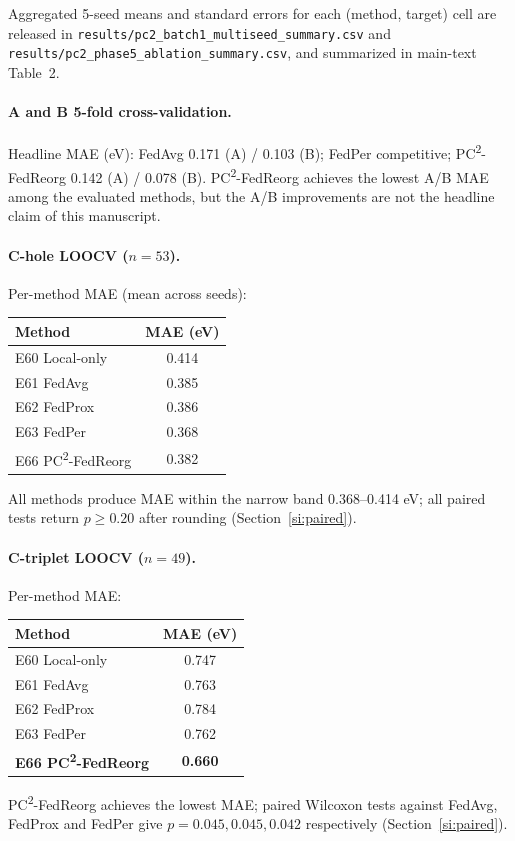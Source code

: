 \documentclass[11pt,a4paper]{article}
\newcommand{\PC}{PC\textsuperscript{2}-FedReorg}
\begin{document}
Aggregated 5-seed means and standard errors for each (method, target) cell are released in \texttt{results/pc2\_batch1\_multiseed\_summary.csv} and \texttt{results/pc2\_phase5\_ablation\_summary.csv}, and summarized in main-text Table~2.

\paragraph{A and B 5-fold cross-validation.} Headline MAE (eV): FedAvg 0.171 (A) / 0.103 (B); FedPer competitive; \PC{} 0.142 (A) / 0.078 (B). \PC{} achieves the lowest A/B MAE among the evaluated methods, but the A/B improvements are not the headline claim of this manuscript.

\paragraph{C-hole LOOCV ($n = 53$).} Per-method MAE (mean across seeds):

\begin{center}
\small
\begin{tabular}{@{}lc@{}}
\toprule
Method & MAE (eV) \\
\midrule
E60 Local-only       & 0.414 \\
E61 FedAvg           & 0.385 \\
E62 FedProx          & 0.386 \\
E63 FedPer           & 0.368 \\
E66 \PC{} & 0.382 \\
\bottomrule
\end{tabular}
\end{center}
All methods produce MAE within the narrow band 0.368--0.414 eV; all paired tests return $p \ge 0.20$ after rounding (Section~\ref{si:paired}).

\paragraph{C-triplet LOOCV ($n = 49$).} Per-method MAE:
\begin{center}
\small
\begin{tabular}{@{}lc@{}}
\toprule
Method & MAE (eV) \\
\midrule
E60 Local-only       & 0.747 \\
E61 FedAvg           & 0.763 \\
E62 FedProx          & 0.784 \\
E63 FedPer           & 0.762 \\
\textbf{E66 \PC{}}   & \textbf{0.660} \\
\bottomrule
\end{tabular}
\end{center}
\PC{} achieves the lowest MAE; paired Wilcoxon tests against FedAvg, FedProx and FedPer give $p = 0.045, 0.045, 0.042$ respectively (Section~\ref{si:paired}).
\end{document}

